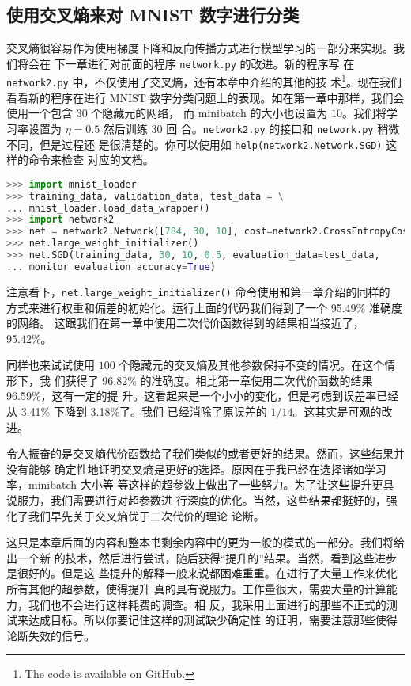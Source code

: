 \subsection{使用交叉熵来对 MNIST 数字进行分类}

交叉熵很容易作为使用梯度下降和反向传播方式进行模型学习的一部分来实现。我们将会在
下一章进行对前面的程序 \lstinline!network.py! 的改进。新的程序写
在 \lstinline!network2.py!  中，不仅使用了交叉熵，还有本章中介绍的其他的技
术\footnote{The code is available on GitHub.}。现在我们看看新的程序在进行 MNIST
数字分类问题上的表现。如在第一章中那样，我们会使用一个包含 $30$ 个隐藏元的网络，
而 minibatch 的大小也设置为 $10$。我们将学习率设置为 $\eta=0.5$ 然后训练 $30$ 回
合。\lstinline!network2.py! 的接口和 \lstinline!network.py! 稍微不同，但是过程还
是很清楚的。你可以使用如 \lstinline!help(network2.Network.SGD)! 这样的命令来检查
对应的文档。

\begin{lstlisting}[language=Python]
>>> import mnist_loader
>>> training_data, validation_data, test_data = \
... mnist_loader.load_data_wrapper()
>>> import network2
>>> net = network2.Network([784, 30, 10], cost=network2.CrossEntropyCost)
>>> net.large_weight_initializer()
>>> net.SGD(training_data, 30, 10, 0.5, evaluation_data=test_data,
... monitor_evaluation_accuracy=True)
\end{lstlisting}

注意看下，\lstinline!net.large_weight_initializer()! 命令使用和第一章介绍的同样的
方式来进行权重和偏差的初始化。运行上面的代码我们得到了一个 95.49\% 准确度的网络。
这跟我们在第一章中使用二次代价函数得到的结果相当接近了，95.42\%。

同样也来试试使用 $100$ 个隐藏元的交叉熵及其他参数保持不变的情况。在这个情形下，我
们获得了 96.82\% 的准确度。相比第一章使用二次代价函数的结果 96.59\%，这有一定的提
升。这看起来是一个小小的变化，但是考虑到误差率已经从 3.41\% 下降到 3.18\%了。我们
已经消除了原误差的 $1/14$。这其实是可观的改进。

令人振奋的是交叉熵代价函数给了我们类似的或者更好的结果。然而，这些结果并没有能够
确定性地证明交叉熵是更好的选择。原因在于我已经在选择诸如学习率，minibatch 大小等
等这样的超参数上做出了一些努力。为了让这些提升更具说服力，我们需要进行对超参数进
行深度的优化。当然，这些结果都挺好的，强化了我们早先关于交叉熵优于二次代价的理论
论断。

这只是本章后面的内容和整本书剩余内容中的更为一般的模式的一部分。我们将给出一个新
的技术，然后进行尝试，随后获得“提升的”结果。当然，看到这些进步是很好的。但是这
些提升的解释一般来说都困难重重。在进行了大量工作来优化所有其他的超参数，使得提升
真的具有说服力。工作量很大，需要大量的计算能力，我们也不会进行这样耗费的调查。相
反，我采用上面进行的那些不正式的测试来达成目标。所以你要记住这样的测试缺少确定性
的证明，需要注意那些使得论断失效的信号。

